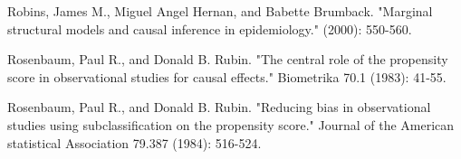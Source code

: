 \documentclass[11pt, oneside]{article}
\begin{document}
\begin{thebibliography}{5}
Robins, James M., Miguel Angel Hernan, and Babette Brumback. "Marginal structural models and causal inference in epidemiology." (2000): 550-560.

Rosenbaum, Paul R., and Donald B. Rubin. "The central role of the propensity score in observational studies for causal effects." Biometrika 70.1 (1983): 41-55.
 
Rosenbaum, Paul R., and Donald B. Rubin. "Reducing bias in observational studies using subclassification on the propensity score." Journal of the American statistical Association 79.387 (1984): 516-524.

\end{thebibliography}
\end{document}
